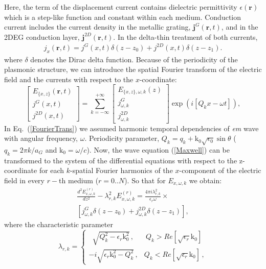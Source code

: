 \documentclass[%
 reprint,
 amsmath,amssymb,
 aps,
]{revtex4-2}
\begin{document}
Here, the term of the displacement current contains dielectric permittivity $\epsilon(\textbf{r})$ which is a step-like function and constant within each medium. Conduction current includes the current density in the metallic grating, $\textbf{j}^G (\textbf{r}, t)$, and in the 2DEG conduction layer, $\textbf{j}^{2D}(\textbf{r}, t)$. In the delta-thin treatment of both currents,
 \begin{align} \label{Current}
  j_{x}(\textbf{r},t)=j^{G}(x,t)\delta(z-z_{0})+j^{2D}(x,t)\delta(z-z_{1}).
\end{align}
where $\delta$ denotes the Dirac delta function. Because of the periodicity of the plasmonic structure, we can introduce the spatial Fourier transform of the electric field and the currents with respect to the $x$-coordinate:
\begin{equation}
 \left[
\begin{array}{c}
E_{\{x,z\}}(\textbf{r},t) \\
 j^{G}(x,t)\\
 j^{2D}(x,t)
  \end{array}
   \right]
  \!\! =\!\! \sum^{+\infty}_{k=-\infty}\!
 \left[
 \begin{array}{c}
  E_{\{x,z\},\omega,k}(z) \\
j^{G}_{\omega,k}\\
j^{2D}_{\omega,k}
   \end{array}
   \right]
   \!\exp(i[Q_k x-\omega t]),
\label{FourierTrans}
\end{equation}
In Eq.~(\ref{FourierTrans}) we assumed harmonic temporal dependencies of \textit{em} wave with angular frequency, $\omega$. Periodicity parameter, $Q_{k}=q_{k}+\text{k}_{0}\sqrt{\epsilon_{0}}\sin{\theta}$ ($q_{k}=2\pi k/a_{G}$ and $\text{k}_{0}=\omega/c$). Now, the wave equation (\ref{Maxwell}) can be transformed to the system of the differential equations with respect to the z-coordinate for each $k$-spatial Fourier harmonics of the $x$-component of the electric field in every $r-$th medium ($r=0..N$). So that for $E_{x,\omega,k}$ we obtain:
 \begin{align}\label{Maxwell1}
    \frac{d^2 E^{(r)}_{x,\omega,k}}{dz^2}-\! \lambda^2_{r,k}E^{(r)}_{x,\omega,k}\!=\frac{4\pi i\lambda_{r,k}^2}{\epsilon_{r}\omega}\!\times\nonumber\\
    \left[j^{G}_{\omega,k}\delta(z-z_{0})\!+\!
     j^{2D}_{\omega,k}\delta(z\!-\!z_{1})\right],
\end{align}
where the characteristic parameter
\begin{equation}
     \lambda_{r,k}=\left\{\begin{array}{ll}
\,\,\, \sqrt{Q_k^2-\epsilon_{r}\text{k}_{0}^2}\,, &\ Q_k>Re[\sqrt{\epsilon_{r}}\text{k}_{0}]\,\\
  -i\sqrt{\epsilon_{r}\text{k}_{0}^2-Q_k^2}\,, & Q_k<Re[\sqrt{\epsilon_{r}}\text{k}_{0}]\,,
  \end{array}\right.
  \label{Lambda}
\end{equation}
\end{document}
